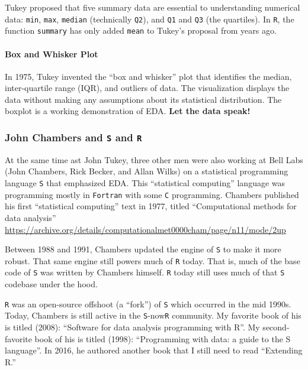 \documentclass[
]{article}
\begin{document}
Tukey proposed that five summary data are essential to understanding
numerical data: \texttt{min}, \texttt{max}, \texttt{median} (technically
\texttt{Q2}), and \texttt{Q1} and \texttt{Q3} (the quartiles). In
\texttt{R}, the function \texttt{summary} has only added \texttt{mean}
to Tukey's proposal from years ago.

\hypertarget{box-and-whisker-plot}{%
\paragraph{Box and Whisker Plot}\label{box-and-whisker-plot}}

In 1975, Tukey invented the ``box and whisker'' plot that identifies the
median, inter-quartile range (IQR), and outliers of data. The
visualization displays the data without making any assumptions about its
statistical distribution. The boxplot is a working demonstration of EDA.
\textbf{Let the data speak!}

\hypertarget{john-chambers-and-s-and-r}{%
\subsubsection{\texorpdfstring{John Chambers and \texttt{S} and
\texttt{R}}{John Chambers and S and R}}\label{john-chambers-and-s-and-r}}

At the same time ast John Tukey, three other men were also working at
Bell Labs (John Chambers, Rick Becker, and Allan Wilks) on a statistical
programming language \texttt{S} that emphasized EDA. This ``statistical
computing'' language was programming mostly in \texttt{Fortran} with
some \texttt{C} programming. Chambers published his first ``statistical
computing'' text in 1977, titled ``Computational methods for data
analysis''
\url{https://archive.org/details/computationalmet0000cham/page/n11/mode/2up}

Between 1988 and 1991, Chambers updated the engine of \texttt{S} to make
it more robust. That same engine still powers much of \texttt{R} today.
That is, much of the base code of \texttt{S} was written by Chambers
himself. \texttt{R} today still uses much of that \texttt{S} codebase
under the hood.

\texttt{R} was an open-source offshoot (a ``fork'') of \texttt{S} which
occurred in the mid 1990s. Today, Chambers is still active in the
\texttt{S}-now\texttt{R} community. My favorite book of his is titled
(2008): ``Software for data analysis programming with R''. My
second-favorite book of his is titled (1998): ``Programming with data: a
guide to the S language''. In 2016, he authored another book that I
still need to read ``Extending R.''
\end{document}
